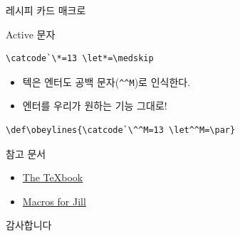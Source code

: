 \documentclass{beamer}
\begin{document}
%
\begin{frame}[standout]
  레시피 카드 매크로
\end{frame}


%
\begin{frame}[fragile]{Active 문자}
  \begin{Verbatim}[fontsize=\small]
\catcode`\*=13 \let*=\medskip
  \end{Verbatim}
\end{frame}


%
\begin{frame}[fragile]{\texttt{\string\obeylines}}
  \begin{itemize}
  \item 텍은 엔터도 공백 문자(\verb+^^M+)로 인식한다. %
  \item 엔터를 우리가 원하는 기능 그대로! 
  \end{itemize}
  
  \begin{Verbatim}[fontsize=\small]
\def\obeylines{\catcode`\^^M=13 \let^^M=\par}
  \end{Verbatim}
\end{frame}


%
\begin{frame}{참고 문서}
  \begin{itemize}
  \item \href{http://ftp.ktug.org/tex-archive/systems/knuth/dist/tex/}
    {The \TeX book}
  \item \href{https://www.tug.org/TUGboat/tb08-3/tb19knut.pdf}
    {Macros for Jill}
  \end{itemize}
\end{frame}


%
\begin{frame}[standout]
  감사합니다
\end{frame}
\end{document}
